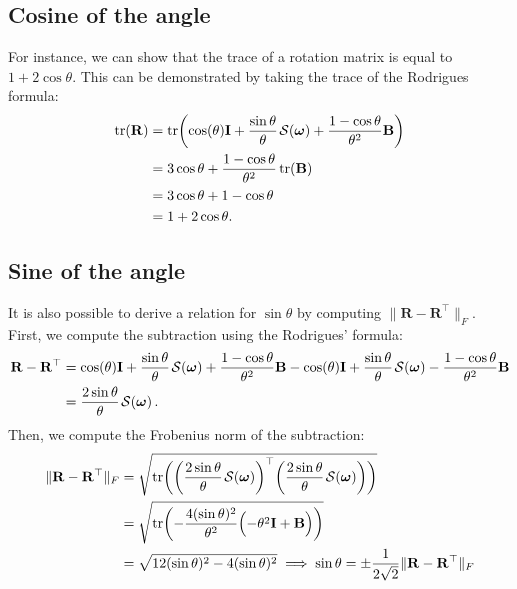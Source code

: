 \subsection{Cosine of the angle}
For instance, we can show that the trace of a rotation matrix is equal to $1+2\cos\theta$. This can be demonstrated by taking the trace of the Rodrigues formula:
\begin{align}
    \tr(\mathbf{R}) &= \tr\biggl(\cos(\theta)\mathbf{I} + \frac{\sin\theta}{\theta}\SL[\boldsymbol{\omega}] + \frac{1-\cos\theta}{\theta^2}\mathbf{B}\biggr)\\
    &= 3\cos\theta + \frac{1-\cos\theta}{\theta^2}\tr(\mathbf{B})\\
    &= 3\cos\theta + 1-\cos\theta\\
    &= 1+2\cos\theta.
\end{align}

\subsection{Sine of the angle}
It is also possible to derive a relation for $\sin\theta$ by computing $\|\mathbf{R} - \mathbf{R}^\top\|_F$. First, we compute the subtraction using the Rodrigues' formula:
\begin{align}
        \mathbf{R} - \mathbf{R}^\top &= \cos(\theta)\mathbf{I} + \frac{\sin\theta}{\theta}\SL[\boldsymbol{\omega}] + \frac{1-\cos\theta}{\theta^2}\mathbf{B} - \cos(\theta)\mathbf{I} + \frac{\sin\theta}{\theta}\SL[\boldsymbol{\omega}] - \frac{1-\cos\theta}{\theta^2}\mathbf{B}\nonumber\\
        &= \frac{2\sin\theta}{\theta}\SL[\boldsymbol{\omega}].
\end{align}
Then, we compute the Frobenius norm of the subtraction:
\begin{align}
    \|\mathbf{R} - \mathbf{R}^\top\|_F &= \sqrt{\tr\biggl(\biggl(\frac{2\sin\theta}{\theta}\SL[\boldsymbol{\omega}]\biggr)^\top\biggl(\frac{2\sin\theta}{\theta}\SL[\boldsymbol{\omega}]\biggr)\biggr)}\\
    &= \sqrt{\tr\biggl(-\frac{4(\sin\theta)^2}{\theta^2}\Bigl( -\theta^2\mathbf{I} + \mathbf{B}\Bigr)\biggr)}\\
    &=\sqrt{ 12(\sin\theta)^2 - 4(\sin\theta)^2}
    \implies \sin\theta = \pm\frac{1}{2\sqrt{2}}\|\mathbf{R} - \mathbf{R}^\top\|_F
\end{align}

